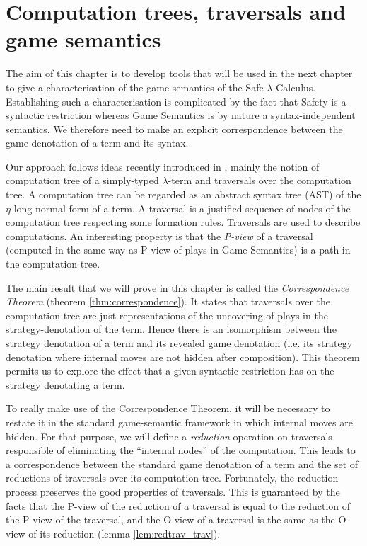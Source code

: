 \chapter{Computation trees, traversals and game semantics}

The aim of this chapter is to develop tools that will be used in the
next chapter to give a characterisation of the game semantics of the
Safe $\lambda$-Calculus. Establishing such a characterisation is
complicated by the fact that Safety is a syntactic restriction
whereas Game Semantics is by nature a syntax-independent semantics.
We therefore need to make an explicit correspondence between the
game denotation of a term and its syntax.

Our approach follows ideas recently introduced in
\cite{OngLics2006}, mainly the notion of computation tree of a
simply-typed $\lambda$-term and traversals over the computation
tree. A computation tree can be regarded as an abstract syntax tree
(AST) of the $\eta$-long normal form of a term. A traversal is a
justified sequence of nodes of the computation tree respecting some
formation rules. Traversals are used to describe computations. An
interesting property is that the \emph{P-view} of a traversal
(computed in the same way as P-view of plays in Game Semantics) is a
path in the computation tree.

The main result that we will prove in this chapter is called the
\emph{Correspondence Theorem} (theorem \ref{thm:correspondence}). It
states that traversals over the computation tree are just
representations of the uncovering of plays in the
strategy-denotation of the term. Hence there is an isomorphism
between the strategy denotation of a term and its revealed game
denotation (i.e. its strategy denotation where internal moves are
not hidden after composition). This theorem permits us to explore
the effect that a given syntactic restriction has on the strategy
denotating a term.

To really make use of the Correspondence Theorem, it will be
necessary to restate it in the standard game-semantic framework in
which internal moves are hidden. For that purpose, we will define a
\emph{reduction} operation on traversals responsible of eliminating
the ``internal nodes'' of the computation. This leads to a
correspondence between the standard game denotation of a term and
the set of reductions of traversals over its computation tree.
Fortunately, the reduction process preserves the good properties of
traversals. This is guaranteed by the facts that the P-view of the
reduction of a traversal is equal to the reduction of the P-view of
the traversal, and the O-view of a traversal is the same as the
O-view of its reduction (lemma \ref{lem:redtrav_trav}). \vspace{8pt}

